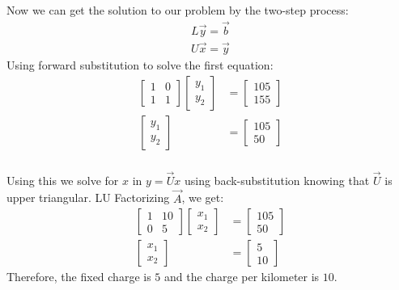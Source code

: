 \documentclass{beamer}
\begin{document}
\begin{frame}
\frametitle{}
Now we can get the solution to our problem by the two-step process:
\begin{align}
    L\vec{y} = \vec{b}\\
    U\vec{x} = \vec{y}
\end{align}
Using forward substitution to solve the first equation:
\begin{align}
    \begin{bmatrix}1 & 0\\1 & 1\end{bmatrix}\begin{bmatrix}y_1\\y_2\end{bmatrix} &= \begin{bmatrix}105\\155\end{bmatrix}\\
    \begin{bmatrix}y_1\\y_2\end{bmatrix} &= \begin{bmatrix}105\\50\end{bmatrix}
\end{align}
    
\end{frame}

\begin{frame}
\frametitle{}
Using this we solve for $x$ in $y = \vec{U}x$ using back-substitution knowing that $\vec{U}$ is upper triangular. LU Factorizing $\vec{A}$, we get:
\begin{align}
    \begin{bmatrix}1 & 10\\0 & 5\end{bmatrix}\begin{bmatrix}x_1\\x_2\end{bmatrix} &= \begin{bmatrix}105\\50\end{bmatrix}\\
    \begin{bmatrix}x_1\\x_2\end{bmatrix} &= \begin{bmatrix}5\\10\end{bmatrix}
\end{align}
Therefore, the fixed charge is $ 5 $ and the charge per kilometer is $  10 $.
\end{frame}
\end{document}
